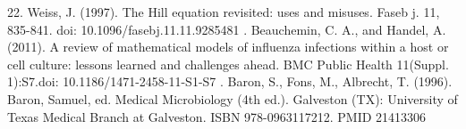\documentclass[a4paper,11pt]{article}
\begin{document}
22. Weiss, J. (1997). The Hill equation revisited: uses and misuses. Faseb j. 11, 835-841. doi: 10.1096/fasebj.11.11.9285481 . Beauchemin, C. A., and Handel, A. (2011). A review of mathematical models of influenza infections within a host or cell culture: lessons learned and challenges ahead. BMC Public Health 11(Suppl. 1):S7.doi: 10.1186/1471-2458-11-S1-S7 . Baron, S., Fons, M., Albrecht, T. (1996). Baron, Samuel, ed. Medical Microbiology (4th ed.). Galveston (TX): University of Texas Medical Branch at Galveston. ISBN 978-0963117212. PMID 21413306
\end{document}
